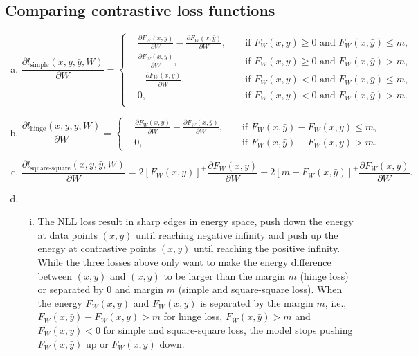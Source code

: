 \documentclass[10pt,a4paper]{article}
\theoremstyle{dotlessP}
\begin{document}
\subsection{Comparing contrastive loss functions}
\begin{enumerate}[(a)]
	\item 
	\begin{equation}
	\frac{\partial l_\text{simple} (x,y, \bar{y}, W)   }{\partial W}=\left\lbrace 
	\begin{aligned}
	&\frac{\partial F_W(x, y)}{\partial W} -\frac{\partial F_W(x, \bar{y})}{\partial W},  && \text{ if } F_W(x,y) \geq 0 \text{ and } F_W(x, \bar{y}) \leq m,\\
	&	\frac{\partial F_W(x, y)}{\partial W},  && \text{ if } F_W(x,y) \geq 0 \text{ and } F_W(x, \bar{y}) > m,\\
	&	-\frac{\partial F_W(x, \bar{y})}{\partial W},  && \text{ if } F_W(x,y) < 0 \text{ and } F_W(x, \bar{y}) \leq m,\\
	&	0,  && \text{ if } F_W(x,y) < 0 \text{ and } F_W(x, \bar{y}) > m.\\
	\end{aligned}\right. 
	\end{equation}
	
	\item 
	\begin{equation}
	\frac{\partial l_\text{hinge} (x,y, \bar{y}, W)   }{\partial W}=\left\lbrace 
	\begin{aligned}
& \frac{\partial F_W(x, y)}{\partial W} -\frac{\partial F_W(x, \bar{y})}{\partial W}, &&  \text{ if } F_W(x, \bar{y}) -F_W(x, y) \leq m, \\
& 0, && \text{ if } F_W(x, \bar{y}) -F_W(x, y) > m.
	\end{aligned}
	\right. 
	\end{equation}
	
	\item 
	\begin{equation}
	\frac{\partial l_\text{square-square} (x,y, \bar{y}, W)   }{\partial W}=
	2[F_W(x,y)]^+ \frac{\partial F_W(x, y)}{\partial W} - 2[m-F_W(x,\bar{y})]^+ \frac{\partial F_W(x, \bar{y})}{\partial W}.
	\end{equation}
	
	\item 
	\begin{enumerate}[(i)]
		\item The NLL loss result in sharp edges in energy space, push down the energy at data points $(x,y)$ until reaching negative infinity and push up the energy at contrastive points $(x, \bar{y})$ until reaching the positive infinity. While the three losses above only want to make the energy difference between $(x,y)$ and $(x, \bar{y})$ to be larger than the margin $m$ (hinge loss) or separated by 0 and margin $m$ (simple and square-square loss). When the energy $F_W(x,y)$ and $F_W(x, \bar{y})$ is separated by the margin $m$, i.e., $F_W(x,\bar{y})-F_W(x,y) >m$ for hinge loss, $F_W(x,\bar{y})>m$ and $F_W(x,y) <0$ for simple and square-square loss, the model stops pushing $F_W(x,\bar{y})$ up or $F_W(x,{y})$ down.
		

\end{enumerate}
\end{enumerate}
\end{document}

